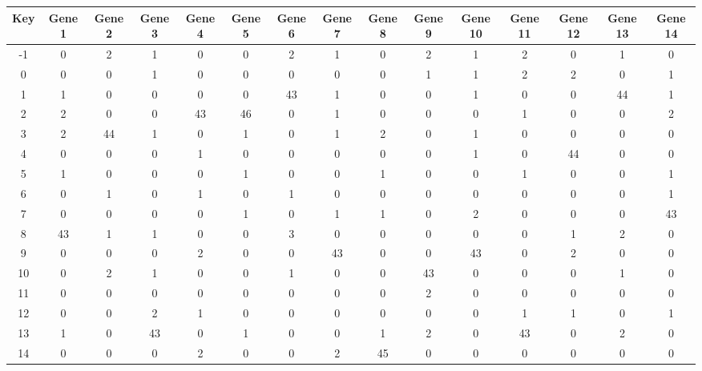 \begin{tabular}{|c|c|c|c|c|c|c|c|c|c|c|c|c|c|c|}
\hline
Key & Gene 1 & Gene 2 & Gene 3 & Gene 4 & Gene 5 & Gene 6 & Gene 7 & Gene 8 & Gene 9 & Gene 10 & Gene 11 & Gene 12 & Gene 13 & Gene 14 \\
\hline
-1 & 0 & 2 & 1 & 0 & 0 & 2 & 1 & 0 & 2 & 1 & 2 & 0 & 1 & 0 \\
0 & 0 & 0 & 1 & 0 & 0 & 0 & 0 & 0 & 1 & 1 & 2 & 2 & 0 & 1 \\
1 & 1 & 0 & 0 & 0 & 0 & 43 & 1 & 0 & 0 & 1 & 0 & 0 & 44 & 1 \\
2 & 2 & 0 & 0 & 43 & 46 & 0 & 1 & 0 & 0 & 0 & 1 & 0 & 0 & 2 \\
3 & 2 & 44 & 1 & 0 & 1 & 0 & 1 & 2 & 0 & 1 & 0 & 0 & 0 & 0 \\
4 & 0 & 0 & 0 & 1 & 0 & 0 & 0 & 0 & 0 & 1 & 0 & 44 & 0 & 0 \\
5 & 1 & 0 & 0 & 0 & 1 & 0 & 0 & 1 & 0 & 0 & 1 & 0 & 0 & 1 \\
6 & 0 & 1 & 0 & 1 & 0 & 1 & 0 & 0 & 0 & 0 & 0 & 0 & 0 & 1 \\
7 & 0 & 0 & 0 & 0 & 1 & 0 & 1 & 1 & 0 & 2 & 0 & 0 & 0 & 43 \\
8 & 43 & 1 & 1 & 0 & 0 & 3 & 0 & 0 & 0 & 0 & 0 & 1 & 2 & 0 \\
9 & 0 & 0 & 0 & 2 & 0 & 0 & 43 & 0 & 0 & 43 & 0 & 2 & 0 & 0 \\
10 & 0 & 2 & 1 & 0 & 0 & 1 & 0 & 0 & 43 & 0 & 0 & 0 & 1 & 0 \\
11 & 0 & 0 & 0 & 0 & 0 & 0 & 0 & 0 & 2 & 0 & 0 & 0 & 0 & 0 \\
12 & 0 & 0 & 2 & 1 & 0 & 0 & 0 & 0 & 0 & 0 & 1 & 1 & 0 & 1 \\
13 & 1 & 0 & 43 & 0 & 1 & 0 & 0 & 1 & 2 & 0 & 43 & 0 & 2 & 0 \\
14 & 0 & 0 & 0 & 2 & 0 & 0 & 2 & 45 & 0 & 0 & 0 & 0 & 0 & 0 \\
\hline
\end{tabular}